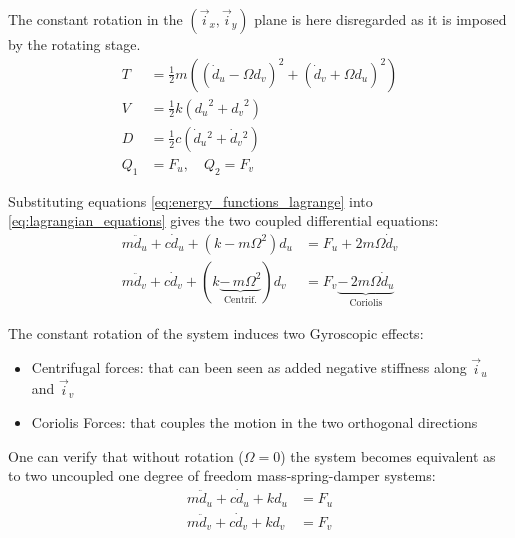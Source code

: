 \documentclass{ISMA_USD2020}
\begin{document}
The constant rotation in the \((\vec{i}_x, \vec{i}_y)\) plane is here disregarded as it is imposed by the rotating stage.
\begin{subequations}
\label{eq:energy_functions_lagrange}
  \begin{align}
    T & = \frac{1}{2} m \left( \left( \dot{d}_u - \Omega d_v \right)^2 + \left( \dot{d}_v + \Omega d_u \right)^2 \right) \\
    V & = \frac{1}{2} k \left( {d_u}^2 + {d_v}^2 \right) \\
    D & = \frac{1}{2} c \left( \dot{d}_u{}^2 + \dot{d}_v{}^2 \right) \\
    Q_1 &= F_u, \quad Q_2 = F_v
  \end{align}
\end{subequations}

Substituting equations \eqref{eq:energy_functions_lagrange} into \eqref{eq:lagrangian_equations} gives the two coupled differential equations:
\begin{subequations}
\label{eq:eom_coupled}
  \begin{align}
    m \ddot{d}_u + c \dot{d}_u + ( k - m \Omega^2 ) d_u &= F_u + 2 m \Omega \dot{d}_v \\
    m \ddot{d}_v + c \dot{d}_v + ( k \underbrace{-\,m \Omega^2}_{\text{Centrif.}} ) d_v &= F_v \underbrace{-\,2 m \Omega \dot{d}_u}_{\text{Coriolis}}
  \end{align}
\end{subequations}

The constant rotation of the system induces two Gyroscopic effects:
\begin{itemize}
\item Centrifugal forces: that can been seen as added negative stiffness along \(\vec{i}_u\) and \(\vec{i}_v\)
\item Coriolis Forces: that couples the motion in the two orthogonal directions
\end{itemize}

One can verify that without rotation (\(\Omega = 0\)) the system becomes equivalent as to two uncoupled one degree of freedom mass-spring-damper systems:
\begin{subequations}
\label{eq:oem_no_rotation}
  \begin{align}
    m \ddot{d}_u + c \dot{d}_u + k d_u &= F_u \\
    m \ddot{d}_v + c \dot{d}_v + k d_v &= F_v
  \end{align}
\end{subequations}
\end{document}

